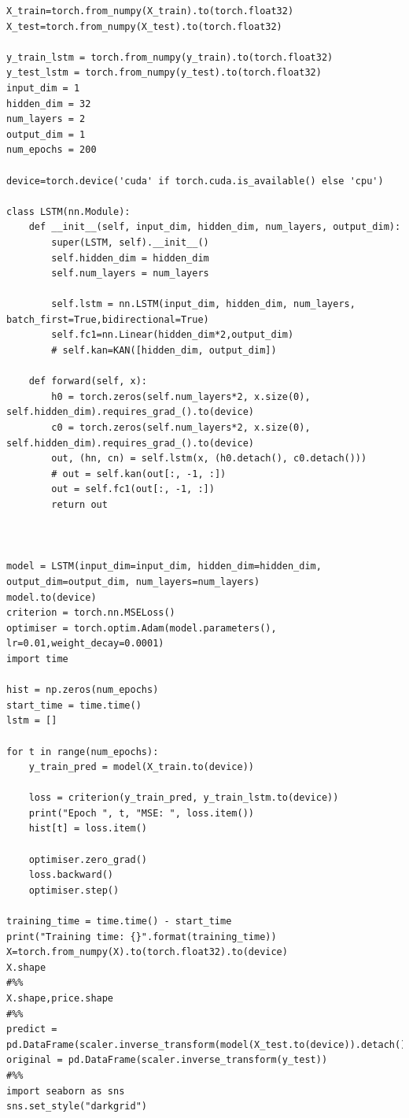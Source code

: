 \documentclass[stu,12pt,floatsintext]{apa7}
\begin{document}
\begin{verbatim}
X_train=torch.from_numpy(X_train).to(torch.float32)
X_test=torch.from_numpy(X_test).to(torch.float32)

y_train_lstm = torch.from_numpy(y_train).to(torch.float32)
y_test_lstm = torch.from_numpy(y_test).to(torch.float32)
input_dim = 1
hidden_dim = 32
num_layers = 2
output_dim = 1
num_epochs = 200

device=torch.device('cuda' if torch.cuda.is_available() else 'cpu')

class LSTM(nn.Module):
    def __init__(self, input_dim, hidden_dim, num_layers, output_dim):
        super(LSTM, self).__init__()
        self.hidden_dim = hidden_dim
        self.num_layers = num_layers

        self.lstm = nn.LSTM(input_dim, hidden_dim, num_layers, batch_first=True,bidirectional=True)
        self.fc1=nn.Linear(hidden_dim*2,output_dim)
        # self.kan=KAN([hidden_dim, output_dim])

    def forward(self, x):
        h0 = torch.zeros(self.num_layers*2, x.size(0), self.hidden_dim).requires_grad_().to(device)
        c0 = torch.zeros(self.num_layers*2, x.size(0), self.hidden_dim).requires_grad_().to(device)
        out, (hn, cn) = self.lstm(x, (h0.detach(), c0.detach()))
        # out = self.kan(out[:, -1, :])
        out = self.fc1(out[:, -1, :])
        return out



model = LSTM(input_dim=input_dim, hidden_dim=hidden_dim, output_dim=output_dim, num_layers=num_layers)
model.to(device)
criterion = torch.nn.MSELoss()
optimiser = torch.optim.Adam(model.parameters(), lr=0.01,weight_decay=0.0001)
import time

hist = np.zeros(num_epochs)
start_time = time.time()
lstm = []

for t in range(num_epochs):
    y_train_pred = model(X_train.to(device))

    loss = criterion(y_train_pred, y_train_lstm.to(device))
    print("Epoch ", t, "MSE: ", loss.item())
    hist[t] = loss.item()

    optimiser.zero_grad()
    loss.backward()
    optimiser.step()

training_time = time.time() - start_time
print("Training time: {}".format(training_time))
X=torch.from_numpy(X).to(torch.float32).to(device)
X.shape
#%%
X.shape,price.shape
#%%
predict = pd.DataFrame(scaler.inverse_transform(model(X_test.to(device)).detach().cpu().numpy()))
original = pd.DataFrame(scaler.inverse_transform(y_test))
#%%
import seaborn as sns
sns.set_style("darkgrid")


\end{verbatim}
\end{document}
